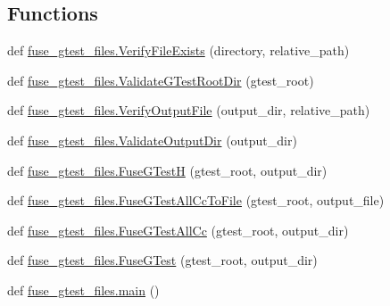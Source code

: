 \subsection*{Functions}
\begin{DoxyCompactItemize}
\item 
def \mbox{\hyperlink{namespacefuse__gtest__files_a333eb5237899fe2f80b0c624ddba363d}{fuse\+\_\+gtest\+\_\+files.\+Verify\+File\+Exists}} (directory, relative\+\_\+path)
\item 
def \mbox{\hyperlink{namespacefuse__gtest__files_aa53690cd3c4ff01cfeea470f363f1dec}{fuse\+\_\+gtest\+\_\+files.\+Validate\+G\+Test\+Root\+Dir}} (gtest\+\_\+root)
\item 
def \mbox{\hyperlink{namespacefuse__gtest__files_ac3cc183b2fc035aff5b7bc07979b486d}{fuse\+\_\+gtest\+\_\+files.\+Verify\+Output\+File}} (output\+\_\+dir, relative\+\_\+path)
\item 
def \mbox{\hyperlink{namespacefuse__gtest__files_a9f584226b1f996ffff820e0751dbd458}{fuse\+\_\+gtest\+\_\+files.\+Validate\+Output\+Dir}} (output\+\_\+dir)
\item 
def \mbox{\hyperlink{namespacefuse__gtest__files_a95685ab66129ced9d7b3db78e6001c8b}{fuse\+\_\+gtest\+\_\+files.\+Fuse\+G\+TestH}} (gtest\+\_\+root, output\+\_\+dir)
\item 
def \mbox{\hyperlink{namespacefuse__gtest__files_ae0209897b164dbb8702169630f4bbf61}{fuse\+\_\+gtest\+\_\+files.\+Fuse\+G\+Test\+All\+Cc\+To\+File}} (gtest\+\_\+root, output\+\_\+file)
\item 
def \mbox{\hyperlink{namespacefuse__gtest__files_a9bcdfab09f297e2b2097d9cdde5ee092}{fuse\+\_\+gtest\+\_\+files.\+Fuse\+G\+Test\+All\+Cc}} (gtest\+\_\+root, output\+\_\+dir)
\item 
def \mbox{\hyperlink{namespacefuse__gtest__files_a4e7007ceec3a7a25617eac3342563ed6}{fuse\+\_\+gtest\+\_\+files.\+Fuse\+G\+Test}} (gtest\+\_\+root, output\+\_\+dir)
\item 
def \mbox{\hyperlink{namespacefuse__gtest__files_a5eaf924c10970f574e1b0459cbbda75a}{fuse\+\_\+gtest\+\_\+files.\+main}} ()
\end{DoxyCompactItemize}
